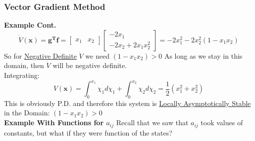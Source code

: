 \documentclass[11pt,handout]{beamer}   %
\begin{document}
\begin{frame}
\frametitle{Vector Gradient Method}
\small
\textbf{Example Cont.}
\begin{equation*}
\dot{V}(\mathbf{x}) = \mathbf{g^T f} = \begin{bmatrix}
x_1 & x_2
\end{bmatrix}
\begin{bmatrix}
-2 x_1 \\ -2 x_2 + 2 x_1 x_2^2
\end{bmatrix} = -2x_1^2 - 2x_2^2 (1-x_1x_2)
\end{equation*}
So for \underline{Negative Definite} $\dot{V}$ we need $(1-x_1 x_2)>0$ As long as we stay in this domain, then $\dot{V}$ will be negative definite.\\
\vspace{6pt}
Integrating:
\begin{equation*}
V(\mathbf{x}) = \int_0^{x_1} \chi_1 d\chi_1 + \int_0^{x_2} \chi_2 d\chi_2 = \frac{1}{2}(x_1^2 + x_2^2)
\end{equation*}
This is obviously P.D. and therefore this system is \underline{Locally Asymptotically Stable} in the Domain: $(1-x_1x_2)>0$\\
\vspace{6pt}
\textbf{Example With Functions for $a_{ij}$}
Recall that we saw that $a_{ij}$ took values of constants, but what if they were function of the states?\\
\end{frame}
\end{document}
